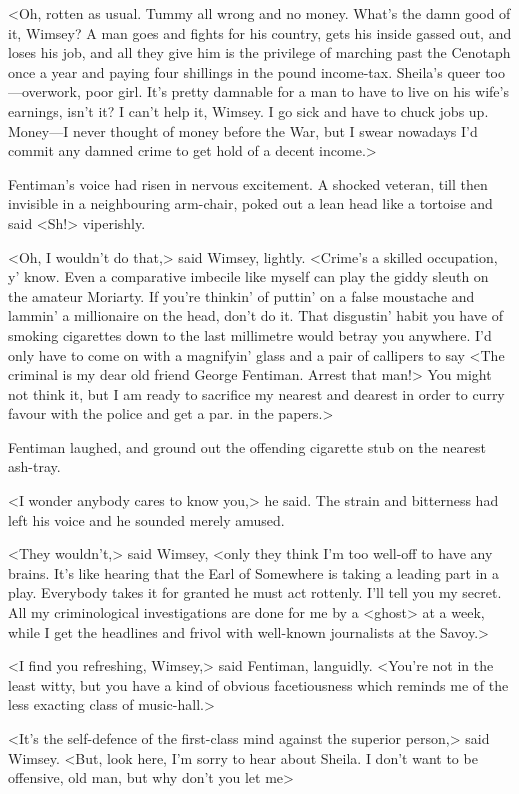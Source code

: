 <Oh, rotten as usual. Tummy all wrong and no money. What's the damn good of it, Wimsey? A man goes and fights for his country, gets his inside gassed out, and loses his job, and all they give him is the privilege of marching past the Cenotaph once a year and paying four shillings in the pound income-tax. Sheila's queer too—overwork, poor girl. It's pretty damnable for a man to have to live on his wife's earnings, isn't it? I can't help it, Wimsey. I go sick and have to chuck jobs up. Money—I never thought of money before the War, but I swear nowadays I'd commit any damned crime to get hold of a decent income.>

Fentiman's voice had risen in nervous excitement. A shocked veteran, till then invisible in a neighbouring arm-chair, poked out a lean head like a tortoise and said <Sh!> viperishly.

<Oh, I wouldn't do that,> said Wimsey, lightly. <Crime's a skilled occupation, y' know. Even a comparative imbecile like myself can play the giddy sleuth on the amateur Moriarty. If you're thinkin' of puttin' on a false moustache and lammin' a millionaire on the head, don't do it. That disgustin' habit you have of smoking cigarettes down to the last millimetre would betray you anywhere. I'd only have to come on with a magnifyin' glass and a pair of callipers to say <The criminal is my dear old friend George Fentiman. Arrest that man!> You might not think it, but I am ready to sacrifice my nearest and dearest in order to curry favour with the police and get a par. in the papers.>

Fentiman laughed, and ground out the offending cigarette stub on the nearest ash-tray.

<I wonder anybody cares to know you,> he said. The strain and bitterness had left his voice and he sounded merely amused.

<They wouldn't,> said Wimsey, <only they think I'm too well-off to have any brains. It's like hearing that the Earl of Somewhere is taking a leading part in a play. Everybody takes it for granted he must act rottenly. I'll tell you my secret. All my criminological investigations are done for me by a <ghost> at  a week, while I get the headlines and frivol with well-known journalists at the Savoy.>

<I find you refreshing, Wimsey,> said Fentiman, languidly. <You're not in the least witty, but you have a kind of obvious facetiousness which reminds me of the less exacting class of music-hall.>

<It's the self-defence of the first-class mind against the superior person,> said Wimsey. <But, look here, I'm sorry to hear about Sheila. I don't want to be offensive, old man, but why don't you let me\longdash>


